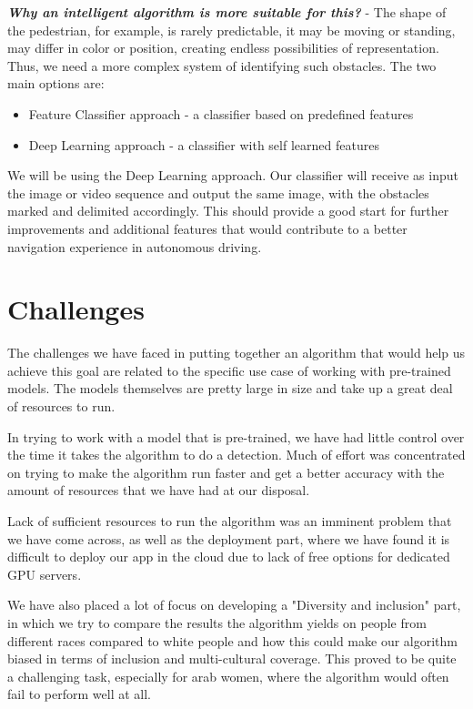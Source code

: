 \documentclass[runningheads,a4paper,11pt]{report}
\begin{document}
\textbf{\emph{Why an intelligent algorithm is more suitable for this?}} - The shape of the pedestrian, for example, is rarely predictable, it may be moving or standing, may differ in color or position, creating endless possibilities of representation. Thus, we need a more complex system of identifying such obstacles. The two main options are:

\begin{itemize}
	\item Feature Classifier approach - a classifier based on predefined features
	\item Deep Learning approach - a classifier with self learned features
\end{itemize}

We will be using the Deep Learning approach. Our classifier will receive as input the image or video sequence and output the same image, with the obstacles marked and delimited accordingly. This should provide a good start for further improvements and additional features that would contribute to a better navigation experience in autonomous driving.

\section{Challenges}

The challenges we have faced in putting together an algorithm that would help us achieve this goal are related to the specific use case of working with pre-trained models. The models themselves are pretty large in size and take up a great deal of resources to run. 

In trying to work with a model that is pre-trained, we have had little control over the time it takes the algorithm to do a detection. Much of effort was concentrated on trying to make the algorithm run faster and get a better accuracy with the amount of resources that we have had at our disposal. 

Lack of sufficient resources to run the algorithm was an imminent problem that we have come across, as well as the deployment part, where we have found it is difficult to deploy our app in the cloud due to lack of free options for dedicated GPU servers.

We have also placed a lot of focus on developing a "Diversity and inclusion" part, in which we try to compare the results the algorithm yields on people from different races compared to white people and how this could make our algorithm biased in terms of inclusion and multi-cultural coverage. This proved to be quite a challenging task, especially for arab women, where the algorithm would often fail to perform well at all.
\end{document}
